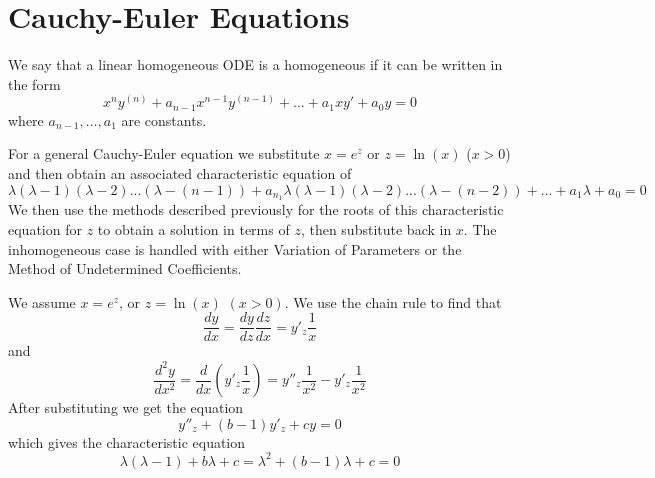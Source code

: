 \documentclass[12pt, a4paper, oneside, openright, titlepage]{book}
\begin{document}

\section{Cauchy-Euler Equations}


\begin{defn}
        We say that a linear homogeneous ODE is a homogeneous  if it can be written in the form \begin{equation}
                x^ny^{(n)}+a_{n-1}x^{n-1}y^{(n-1)}+...+a_1xy'+a_0y=0
        \end{equation}
        where $a_{n-1},...,a_1$ are constants.
\end{defn}




\begin{defn}
        For a general Cauchy-Euler equation we substitute $x = e^z$ or $z = \ln(x)$ ($x > 0$) and then obtain an associated characteristic equation of \begin{equation}
                \lambda(\lambda - 1)(\lambda - 2)...(\lambda - (n-1)) + a_{n_1}\lambda(\lambda - 1)(\lambda - 2)...(\lambda - (n-2)) + ... + a_1\lambda + a_0 = 0
        \end{equation}
        We then use the methods described previously for the roots of this characteristic equation for $z$ to obtain a solution in terms of $z$, then substitute back in $x$. The inhomogeneous case is handled with either Variation of Parameters or the Method of Undetermined Coefficients.
\end{defn}




\begin{eg}
        We assume $x = e^{z}$, or $z = \ln(x)$ $(x > 0)$. We use the chain rule to find that $$\frac{dy}{dx} = \frac{dy}{dz}\frac{dz}{dx} = y'_z\frac{1}{x}$$
        and $$\frac{d^2y}{dx^2} = \frac{d}{dx}\left(y'_z\frac{1}{x}\right) = y''_z\frac{1}{x^2} - y'_z\frac{1}{x^2}$$ After substituting we get the equation \begin{equation}
                y''_z + (b-1)y'_z +cy = 0
        \end{equation}
        which gives the characteristic equation\begin{equation}
                \lambda(\lambda - 1) + b\lambda + c = \lambda^2 + (b-1)\lambda +c = 0
        \end{equation}
\end{eg}
\end{document}
